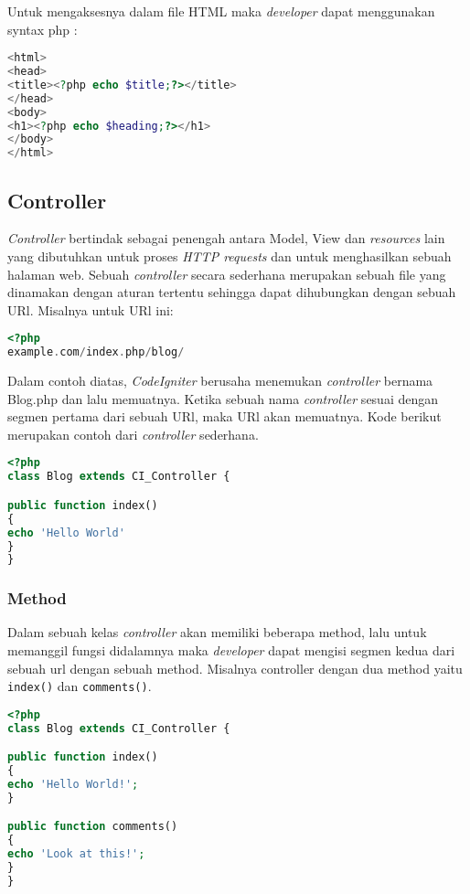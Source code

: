 Untuk mengaksesnya dalam file HTML maka \textit{developer} dapat menggunakan syntax php :
\begin{lstlisting}[frame=single, language=PHP, label={lst:htmlaCI}, caption=Akses data dinamis dalam file HTML.] 
<html>
<head>
<title><?php echo $title;?></title>
</head>
<body>
<h1><?php echo $heading;?></h1>
</body>
</html>
\end{lstlisting}

\subsection{Controller}
\textit{Controller} bertindak sebagai penengah antara Model, View dan \textit{resources} lain yang dibutuhkan untuk proses \textit{HTTP requests} dan untuk menghasilkan sebuah halaman web. Sebuah \textit{controller} secara sederhana merupakan sebuah file yang dinamakan dengan aturan tertentu sehingga dapat dihubungkan dengan sebuah URl.
Misalnya untuk URl ini:
\begin{lstlisting}[frame=single, language=PHP, label={lst:controllerCI}, caption=Controller pada codeIgniter.] 
<?php
example.com/index.php/blog/
\end{lstlisting}

Dalam contoh diatas, \textit{CodeIgniter} berusaha menemukan \textit{controller} bernama Blog.php dan lalu memuatnya. Ketika sebuah nama \textit{controller} sesuai dengan segmen pertama dari sebuah URl, maka URl akan memuatnya. Kode berikut merupakan contoh dari \textit{controller} sederhana.
\begin{lstlisting}[frame=single, language=PHP, label={lst:contohControllerCI}, caption=Contoh controller pada codeIgniter.] 
<?php
class Blog extends CI_Controller {

public function index()
{
echo 'Hello World'
}
}
\end{lstlisting} 

\subsubsection{Method}
Dalam sebuah kelas \textit{controller} akan memiliki beberapa method, lalu untuk memanggil fungsi didalamnya maka \textit{developer} dapat mengisi segmen kedua dari sebuah url dengan sebuah method. Misalnya controller dengan dua method yaitu \texttt{index()} dan \texttt{comments()}.
\begin{lstlisting}[frame=single, language=PHP, label={lst:methodCI}, caption=Method pada codeIgniter.] 
<?php
class Blog extends CI_Controller {

public function index()
{
echo 'Hello World!';
}

public function comments()
{
echo 'Look at this!';
}
}
\end{lstlisting}

